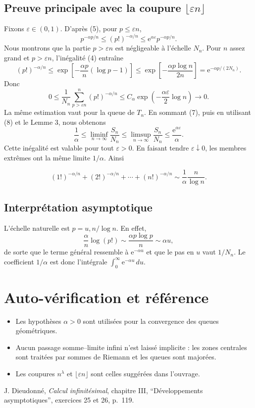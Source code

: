 \documentclass[11pt,a4paper]{article}
\newcommand{\eps}{\varepsilon}
\newcommand{\e}{\mathrm e}
\begin{document}
\subsection{Preuve principale avec la coupure $\lfloor\eps n\rfloor$}
Fixons $\eps\in(0,1)$. D'apr\`es (5), pour $p\leq\eps n$,
\[
 p^{-\alpha p/n}\leq(p!)^{-\alpha/n}
 \leq\e^{\alpha\eps}p^{-\alpha p/n}. \tag{7}
\]
Nous montrons que la partie $p>\eps n$ est n\'egligeable \`a l'\'echelle $N_n$.
Pour $n$ assez grand et $p>\eps n$, l'in\'egalit\'e (4) entra\^ine
\[
 (p!)^{-\alpha/n}
 \leq\exp\left[-\frac{\alpha p}{n}(\log p-1)\right]
 \leq\exp\left[-\frac{\alpha p\log n}{2n}\right]
 =\e^{-\alpha p/(2N_n)}.
\]
Donc
\begin{equation}
 0\leq\frac1{N_n}\sum_{p>\eps n}^{n}(p!)^{-\alpha/n}
 \leq C_\alpha\exp\left(-\frac{\alpha\eps}{2}\log n\right)
 \longrightarrow0. \tag{8}
\end{equation}
La m\^eme estimation vaut pour la queue de $T_n$. En sommant (7), puis en
utilisant (8) et le Lemme 3, nous obtenons
\[
 \frac1\alpha
 \leq\liminf_{n\to\infty}\frac{S_n}{N_n}
 \leq\limsup_{n\to\infty}\frac{S_n}{N_n}
 \leq\frac{\e^{\alpha\eps}}\alpha.
\]
Cette in\'egalit\'e est valable pour tout $\eps>0$. En faisant tendre
$\eps\downarrow0$, les membres extr\^emes ont la m\^eme limite $1/\alpha$.
Ainsi
\begin{resultbox}
\[
 \boxed{\displaystyle
 (1!)^{-\alpha/n}+(2!)^{-\alpha/n}+\cdots+(n!)^{-\alpha/n}
 \sim\frac1\alpha\frac{n}{\log n}.}
\]
\end{resultbox}

\subsection{Interpr\'etation asymptotique}
\begin{remarkbox}
L'\'echelle naturelle est $p=u,n/\log n$. En effet,
\[
 \frac{\alpha}{n}\log(p!)\sim\frac{\alpha p\log p}{n}\sim\alpha u,
\]
de sorte que le terme g\'en\'eral ressemble \`a $\e^{-\alpha u}$ et que le pas
en $u$ vaut $1/N_n$. Le coefficient $1/\alpha$ est donc l'int\'egrale
$\int_0^\infty\e^{-\alpha u}\,du$.
\end{remarkbox}

\section{Auto-v\'erification et r\'ef\'erence}
\begin{itemize}[leftmargin=*]
\item Les hypoth\`eses $\alpha>0$ sont utilis\'ees pour la convergence des
queues g\'eom\'etriques.
\item Aucun passage somme--limite infini n'est laiss\'e implicite : les zones
centrales sont trait\'ees par sommes de Riemann et les queues sont major\'ees.
\item Les coupures $n^\lambda$ et $\lfloor\eps n\rfloor$ sont celles sugg\'er\'ees
dans l'ouvrage.
\end{itemize}
\medskip
J. Dieudonn\'e, \emph{Calcul infinit\'esimal}, chapitre III,
``D\'eveloppements asymptotiques'', exercices 25 et 26, p.~119.
\end{document}
